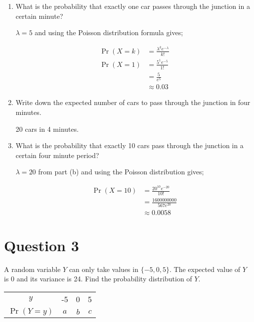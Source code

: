 \documentclass[11pt]{article}
\begin{document}
\begin{enumerate}[label= (\alph*)]
  \item What is the probability that exactly one car passes through the
    junction in a certain minute?

  $\lambda = 5$ and using the Poisson distribution formula gives;

  \begin{align*}
    \Pr(X=k) &= \frac{{\lambda}^k {e}^{- \lambda}}{k!} \\
    \Pr(X=1) &= \frac{5^1 e^{-5}}{1!} \\
    &= \frac{5}{e^5} \\
    &\approx 0.03
  \end{align*}

  \item Write down the expected number of cars to pass through the junction in
    four minutes.

    20 cars in 4 minutes.

  \item What is the probability that exactly 10 cars pass through the junction
    in a certain four minute period?

    $\lambda = 20$ from part (b) and using the Poisson distribution gives;

    \begin{align*}
      \Pr(X=10) &= \frac{20^{10} e^{-20}}{10!} \\
      &= \frac{1600000000}{567 e^{20}} \\
      &\approx 0.0058
    \end{align*}
\end{enumerate}

\break{}
\section*{Question 3}

A random variable $Y$ can only take values in $ \{ -5, 0, 5 \}$. The expected
value of $Y$ is 0 and its variance is 24. Find the probability distribution of
$Y$.

\begin{center}
  \begin{tabular}{c c c c}
    \toprule
    $y$ & -5 & 0 & 5 \\
    $\Pr(Y=y)$ & $a$ & $b$ & $c$ \\
    \bottomrule
  \end{tabular}
\end{center}
\end{document}
